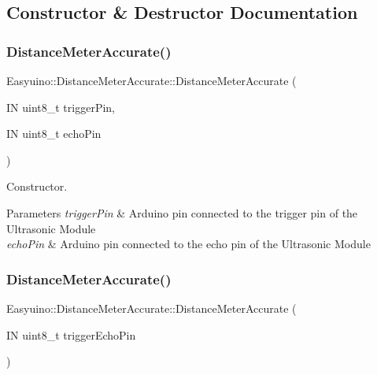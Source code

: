 \subsection{Constructor \& Destructor Documentation}
\mbox{\label{class_easyuino_1_1_distance_meter_accurate_a57f810d7e6653028bc23139e703985d7}} 
\subsubsection{\texorpdfstring{Distance\+Meter\+Accurate()}{DistanceMeterAccurate()}\hspace{0.1cm}{\footnotesize\ttfamily [1/2]}}
{\footnotesize\ttfamily Easyuino\+::\+Distance\+Meter\+Accurate\+::\+Distance\+Meter\+Accurate (\begin{DoxyParamCaption}\item[{IN uint8\+\_\+t}]{trigger\+Pin,  }\item[{IN uint8\+\_\+t}]{echo\+Pin }\end{DoxyParamCaption})}



Constructor. 


\begin{DoxyParams}{Parameters}
{\em trigger\+Pin} & Arduino pin connected to the trigger pin of the Ultrasonic Module \\
\hline
{\em echo\+Pin} & Arduino pin connected to the echo pin of the Ultrasonic Module \\
\hline
\end{DoxyParams}
\mbox{\label{class_easyuino_1_1_distance_meter_accurate_a6e58a043f9d28dd6c7e4c5b819607341}} 
\subsubsection{\texorpdfstring{Distance\+Meter\+Accurate()}{DistanceMeterAccurate()}\hspace{0.1cm}{\footnotesize\ttfamily [2/2]}}
{\footnotesize\ttfamily Easyuino\+::\+Distance\+Meter\+Accurate\+::\+Distance\+Meter\+Accurate (\begin{DoxyParamCaption}\item[{IN uint8\+\_\+t}]{trigger\+Echo\+Pin }\end{DoxyParamCaption})}



